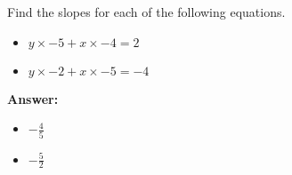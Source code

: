  Find the slopes for each of the following equations. \begin{itemize}\item \( y \times -5 + x \times -4 = 2 \)\item \( y \times -2 + x \times -5 = -4 \)\end{itemize}

        \textbf{Answer:} \begin{itemize}\item \( -\frac{4}{5} \)\item \( -\frac{5}{2} \)\end{itemize}
